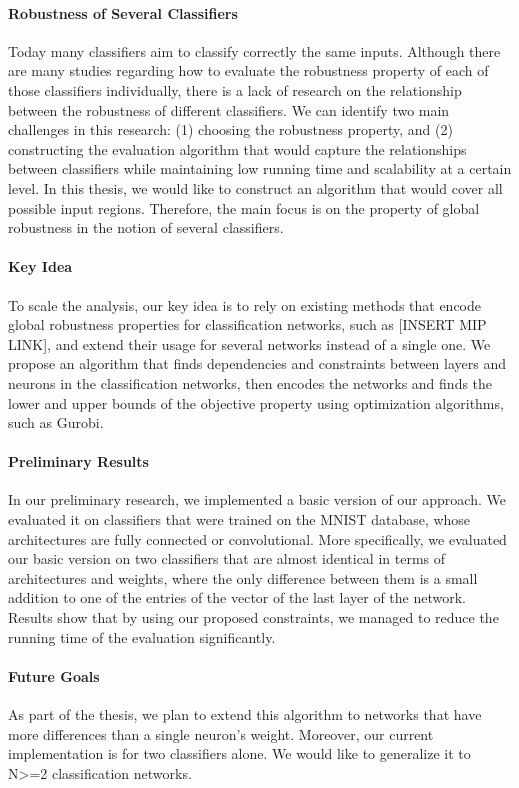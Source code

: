 \paragraph{Robustness of Several Classifiers}
Today many classifiers aim to classify correctly the same inputs. Although there are many studies regarding how to evaluate the robustness property of each of those classifiers individually, there is a lack of research on the relationship between the robustness of different classifiers. We can identify two main challenges in this research: (1) choosing the robustness property, and (2) constructing the evaluation algorithm that would capture the relationships between classifiers while maintaining low running time and scalability at a certain level. In this thesis, we would like to construct an algorithm that would cover all possible input regions. Therefore, the main focus is on the property of global robustness in the notion of several classifiers.


\paragraph{Key Idea}
To scale the analysis, our key idea is to rely on existing methods that encode global robustness properties for classification networks, such as [INSERT MIP LINK], and extend their usage for several networks instead of a single one. We propose an algorithm that finds dependencies and constraints between layers and neurons in the classification networks, then encodes the networks and finds the lower and upper bounds of the objective property using optimization algorithms, such as Gurobi. 


\paragraph{Preliminary Results}
In our preliminary research, we implemented a basic version of our approach. We evaluated it on classifiers that were trained on the MNIST database, whose architectures are fully connected or convolutional. More specifically, we evaluated our basic version on two classifiers that are almost identical in terms of architectures and weights, where the only difference between them is a small addition to one of the entries of the vector of the last layer of the network. Results show that by using our proposed constraints, we managed to reduce the running time of the evaluation significantly.

\paragraph{Future Goals}
As part of the thesis, we plan to extend this algorithm to networks that have more differences than a single neuron's weight. Moreover, our current implementation is for two classifiers alone. We would like to generalize it to N>=2 classification networks.

